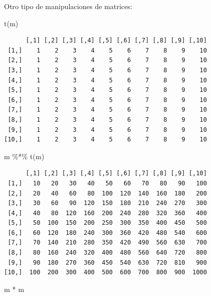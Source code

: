 \documentclass[
  letterpaper,
  DIV=11,
  numbers=noendperiod]{scrartcl}
\newenvironment{Shaded}{\begin{snugshade}}{\end{snugshade}}
\newcommand{\FunctionTok}[1]{\textcolor[rgb]{0.28,0.35,0.67}{#1}}
\newcommand{\NormalTok}[1]{\textcolor[rgb]{0.00,0.23,0.31}{#1}}
\newcommand{\SpecialCharTok}[1]{\textcolor[rgb]{0.37,0.37,0.37}{#1}}
\begin{document}
Otro tipo de manipulaciones de matrices:

\begin{Shaded}
\begin{Highlighting}[]
\FunctionTok{t}\NormalTok{(m)          }
\end{Highlighting}
\end{Shaded}

\begin{verbatim}
      [,1] [,2] [,3] [,4] [,5] [,6] [,7] [,8] [,9] [,10]
 [1,]    1    2    3    4    5    6    7    8    9    10
 [2,]    1    2    3    4    5    6    7    8    9    10
 [3,]    1    2    3    4    5    6    7    8    9    10
 [4,]    1    2    3    4    5    6    7    8    9    10
 [5,]    1    2    3    4    5    6    7    8    9    10
 [6,]    1    2    3    4    5    6    7    8    9    10
 [7,]    1    2    3    4    5    6    7    8    9    10
 [8,]    1    2    3    4    5    6    7    8    9    10
 [9,]    1    2    3    4    5    6    7    8    9    10
[10,]    1    2    3    4    5    6    7    8    9    10
\end{verbatim}

\begin{Shaded}
\begin{Highlighting}[]
\NormalTok{m }\SpecialCharTok{\%*\%} \FunctionTok{t}\NormalTok{(m)   }
\end{Highlighting}
\end{Shaded}

\begin{verbatim}
      [,1] [,2] [,3] [,4] [,5] [,6] [,7] [,8] [,9] [,10]
 [1,]   10   20   30   40   50   60   70   80   90   100
 [2,]   20   40   60   80  100  120  140  160  180   200
 [3,]   30   60   90  120  150  180  210  240  270   300
 [4,]   40   80  120  160  200  240  280  320  360   400
 [5,]   50  100  150  200  250  300  350  400  450   500
 [6,]   60  120  180  240  300  360  420  480  540   600
 [7,]   70  140  210  280  350  420  490  560  630   700
 [8,]   80  160  240  320  400  480  560  640  720   800
 [9,]   90  180  270  360  450  540  630  720  810   900
[10,]  100  200  300  400  500  600  700  800  900  1000
\end{verbatim}

\begin{Shaded}
\begin{Highlighting}[]
\NormalTok{m }\SpecialCharTok{*}\NormalTok{ m         }
\end{Highlighting}
\end{Shaded}
\end{document}
